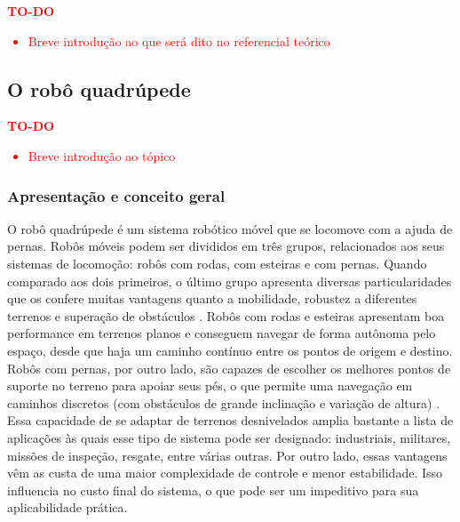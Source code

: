 \documentclass[../main.tex]{subfiles}
\begin{document}
  \textcolor{red}{\textbf{TO-DO}
  \begin{itemize}
    \item Breve introdução ao que será dito no referencial teórico
  \end{itemize}
  }

  \subsection{O robô quadrúpede}
  \textcolor{red}{\textbf{TO-DO}
  \begin{itemize}
    \item Breve introdução ao tópico
  \end{itemize}
  }

  \subsubsection{Apresentação e conceito geral}
  O robô quadrúpede é um sistema robótico móvel que se locomove com a ajuda de pernas. Robôs móveis podem ser divididos em três grupos, relacionados aos seus sistemas de locomoção: robôs com rodas, com esteiras e com pernas. Quando comparado aos dois primeiros, o último grupo apresenta diversas particularidades que os confere muitas vantagens quanto a mobilidade, robustez a diferentes terrenos e superação de obstáculos \cite{Biswal2021}. Robôs com rodas e esteiras apresentam boa performance em terrenos planos e conseguem navegar de forma autônoma pelo espaço, desde que haja um caminho contínuo entre os pontos de origem e destino. Robôs com pernas, por outro lado, são capazes de escolher os melhores pontos de suporte no terreno para apoiar seus pés, o que permite uma navegação em caminhos discretos (com obstáculos de grande inclinação e variação de altura) \cite{Yao2021}. Essa capacidade de se adaptar de terrenos desnivelados amplia bastante a lista de aplicações às quais esse tipo de sistema pode ser designado: industriais, militares, missões de inspeção, resgate, entre várias outras. Por outro lado, essas vantagens vêm as custa de uma maior complexidade de controle e menor estabilidade. Isso influencia no custo final do sistema, o que pode ser um impeditivo para sua aplicabilidade prática. 
\end{document}
